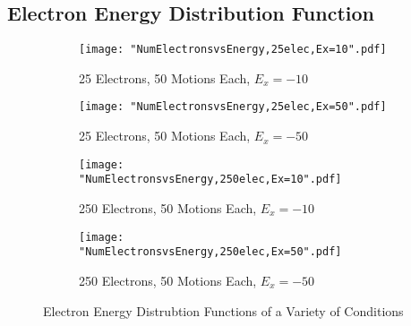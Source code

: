 \documentclass[12pt]{article}
\begin{document}
\subsection{Electron Energy Distribution Function}
\begin{figure}[h]
	\centering
	\begin{subfigure}{0.49\textwidth}
		\centering
		\texttt{[image: "NumElectronsvsEnergy,25elec,Ex=10".pdf]}
		\label{EEDF 25 Electrons Field Magnitude 10}
		\caption{25 Electrons, 50 Motions Each, $E_{x} = -10$}
	\end{subfigure}
	\begin{subfigure}{0.49\textwidth}
		\centering
		\texttt{[image: "NumElectronsvsEnergy,25elec,Ex=50".pdf]}
		\label{EEDF 25 Electrons Field Magnitude 10}
		\caption{25 Electrons, 50 Motions Each, $E_{x} = -50$}
	\end{subfigure}
	\begin{subfigure}{0.49\textwidth}
		\centering
		\texttt{[image: "NumElectronsvsEnergy,250elec,Ex=10".pdf]}
		\label{EEDF 25 Electrons Field Magnitude 10}
		\caption{250 Electrons, 50 Motions Each, $E_{x} = -10$}
	\end{subfigure}
	\begin{subfigure}{0.49\textwidth}
		\centering
		\texttt{[image: "NumElectronsvsEnergy,250elec,Ex=50".pdf]}
		\label{EEDF 25 Electrons Field Magnitude 10}
		\caption{250 Electrons, 50 Motions Each, $E_{x} = -50$}
	\end{subfigure}
	\label{EEDFs}
	\caption{Electron Energy Distrubtion Functions of a Variety of Conditions}
\end{figure}
\end{document}
